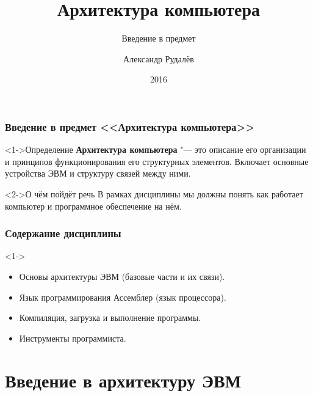 \documentclass[pdf,9pt,aspectratio=169]{beamer}
\title[]{Архитектура компьютера}
\subtitle{Введение в предмет}
\author[]{Александр Рудалёв}
\institute[]{ИМИКТ САФУ}
\date[]{2016}
\begin{document}
\frame{\titlepage}

\begin{frame}\frametitle{Введение в предмет <<Архитектура компьютера>>}
  \begin{block}<1->{Определение}
    \textbf{Архитектура компьютера} "---  это описание его организации и принципов функционирования его структурных элементов. Включает основные устройства ЭВМ и структуру связей между ними.
  \end{block}
  \begin{block}<2->{О чём пойдёт речь}
    В рамках дисциплины мы должны понять как работает компьютер и программное обеспечение на нём.
  \end{block}
\end{frame}

\begin{frame}\frametitle{Содержание дисциплины}
  \begin{block}<1->{}
    \begin{itemize}
      \item Основы архитектуры ЭВМ (базовые части и их связи).
      \item Язык программирования Ассемблер (язык процессора).
      \item Компиляция, загрузка и выполнение программы.
      \item Инструменты программиста.
    \end{itemize}
  \end{block}
\end{frame}

\section{Введение в архитектуру ЭВМ}
\end{document}
